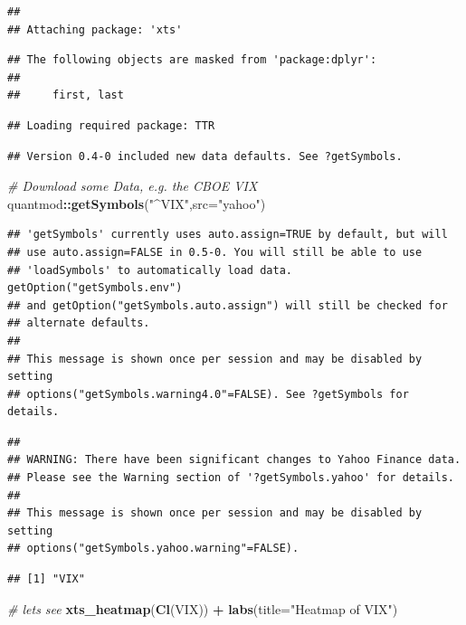 \documentclass[]{krantz}
\makeatletter
\newenvironment{Shaded}{\begin{snugshade}}{\end{snugshade}}
\newcommand{\KeywordTok}[1]{\textcolor[rgb]{0.13,0.29,0.53}{\textbf{#1}}}
\newcommand{\DataTypeTok}[1]{\textcolor[rgb]{0.13,0.29,0.53}{#1}}
\newcommand{\StringTok}[1]{\textcolor[rgb]{0.31,0.60,0.02}{#1}}
\newcommand{\CommentTok}[1]{\textcolor[rgb]{0.56,0.35,0.01}{\textit{#1}}}
\newcommand{\OperatorTok}[1]{\textcolor[rgb]{0.81,0.36,0.00}{\textbf{#1}}}
\newcommand{\NormalTok}[1]{#1}
\newenvironment{kframe}{%
\medskip{}
\setlength{\fboxsep}{.8em}
 \def\at@end@of@kframe{}%
 \ifinner\ifhmode%
  \def\at@end@of@kframe{\end{minipage}}%
  \begin{minipage}{\columnwidth}%
 \fi\fi%
 \def\FrameCommand##1{\hskip\@totalleftmargin \hskip-\fboxsep
 \colorbox{shadecolor}{##1}\hskip-\fboxsep
     \hskip-\linewidth \hskip-\@totalleftmargin \hskip\columnwidth}%
 \MakeFramed {\advance\hsize-\width
   \@totalleftmargin\z@ \linewidth\hsize
   \@setminipage}}%
 {\par\unskip\endMakeFramed%
 \at@end@of@kframe}
\renewenvironment{Shaded}{\begin{kframe}}{\end{kframe}}
\theoremstyle{definition}
\theoremstyle{definition}
\theoremstyle{definition}
\theoremstyle{remark}
\makeatother
\begin{document}
\begin{verbatim}
## 
## Attaching package: 'xts'
\end{verbatim}

\begin{verbatim}
## The following objects are masked from 'package:dplyr':
## 
##     first, last
\end{verbatim}

\begin{verbatim}
## Loading required package: TTR
\end{verbatim}

\begin{verbatim}
## Version 0.4-0 included new data defaults. See ?getSymbols.
\end{verbatim}

\begin{Shaded}
\begin{Highlighting}[]
\CommentTok{# Download some Data, e.g. the CBOE VIX }
\NormalTok{quantmod}\OperatorTok{::}\KeywordTok{getSymbols}\NormalTok{(}\StringTok{"^VIX"}\NormalTok{,}\DataTypeTok{src=}\StringTok{"yahoo"}\NormalTok{)}
\end{Highlighting}
\end{Shaded}

\begin{verbatim}
## 'getSymbols' currently uses auto.assign=TRUE by default, but will
## use auto.assign=FALSE in 0.5-0. You will still be able to use
## 'loadSymbols' to automatically load data. getOption("getSymbols.env")
## and getOption("getSymbols.auto.assign") will still be checked for
## alternate defaults.
## 
## This message is shown once per session and may be disabled by setting 
## options("getSymbols.warning4.0"=FALSE). See ?getSymbols for details.
\end{verbatim}

\begin{verbatim}
## 
## WARNING: There have been significant changes to Yahoo Finance data.
## Please see the Warning section of '?getSymbols.yahoo' for details.
## 
## This message is shown once per session and may be disabled by setting
## options("getSymbols.yahoo.warning"=FALSE).
\end{verbatim}

\begin{verbatim}
## [1] "VIX"
\end{verbatim}

\begin{Shaded}
\begin{Highlighting}[]
\CommentTok{# lets see}
\KeywordTok{xts_heatmap}\NormalTok{(}\KeywordTok{Cl}\NormalTok{(VIX)) }\OperatorTok{+}\StringTok{ }\KeywordTok{labs}\NormalTok{(}\DataTypeTok{title=}\StringTok{"Heatmap of VIX"}\NormalTok{)}
\end{Highlighting}
\end{Shaded}
\end{document}
